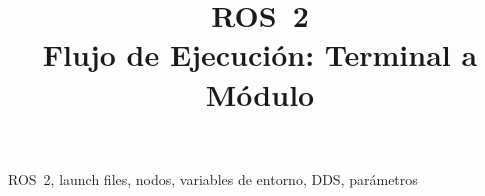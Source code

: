 \documentclass[conference]{IEEEtran}
\begin{document}
\title{ROS~2\\
Flujo de Ejecución: Terminal a Módulo}


\maketitle


\begin{IEEEkeywords}
ROS~2, launch files, nodos, variables de entorno, DDS, parámetros
\end{IEEEkeywords}








\end{document}
